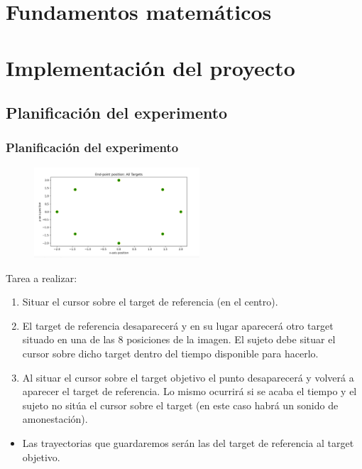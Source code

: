 \documentclass{beamer}
\begin{document}
\section{Fundamentos matemáticos}

\section{Implementación del proyecto}
\subsection{Planificación del experimento}
\begin{frame}
	\frametitle{Planificación del experimento}
	\fontsize{8pt}{9pt}\selectfont
	\begin{figure}
		\centering
		\includegraphics[width=0.55\textwidth]{points}
	\end{figure}
	
Tarea a realizar:
	\begin{enumerate}
		\item Situar el cursor sobre el target de referencia (en el centro).
		\item El target de referencia desaparecerá y en su lugar aparecerá otro target situado en una de las 8 posiciones de la imagen. El sujeto debe situar el cursor sobre dicho target dentro del tiempo disponible para hacerlo.
		\item Al situar el cursor sobre el target objetivo el punto desaparecerá y volverá a aparecer el target de referencia. Lo mismo ocurrirá si se acaba el tiempo y el sujeto no sitúa el cursor sobre el target (en este caso habrá un sonido de amonestación).
	\end{enumerate}	
\begin{itemize}
	\item Las trayectorias que guardaremos serán las del target de referencia al target objetivo.
\end{itemize}	
\end{frame}
\end{document}
